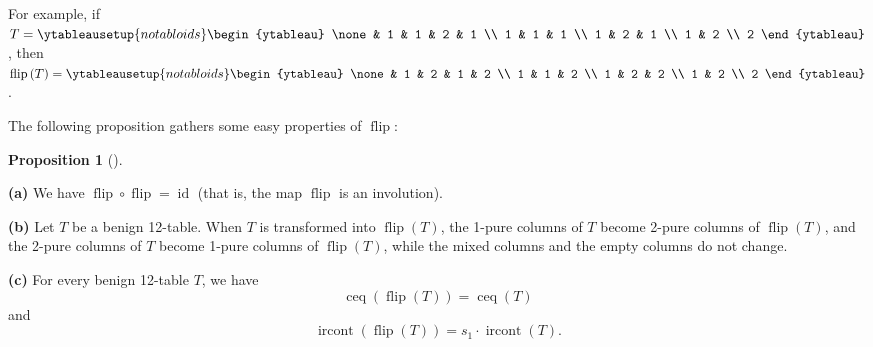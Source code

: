 \documentclass[numbers=enddot,12pt,final,onecolumn,notitlepage]{scrartcl}%
\theoremstyle{definition}
\newtheorem{prop}[theo]{Proposition}
\newenvironment{proposition}[1][]
{\begin{prop}[#1]\begin{leftbar}}
{\end{leftbar}\end{prop}}
\begin{document}
For example, if $T=%
\ytableausetup{notabloids}
\begin{ytableau}
\none& 1 & 1 & 2 & 1 \\
1 & 1 & 1 \\
1 & 2 & 1 \\
1 & 2 \\
2
\end{ytableau}%
$, then $\operatorname*{flip}\left(  T\right)  =%
\ytableausetup{notabloids}
\begin{ytableau}
\none& 1 & 2 & 1 & 2 \\
1 & 1 & 2 \\
1 & 2 & 2 \\
1 & 2 \\
2
\end{ytableau}%
$.

The following proposition gathers some easy properties of
$\operatorname*{flip}$:

\begin{proposition}
\label{prop.flip}\textbf{(a)} We have $\operatorname*{flip}\circ
\operatorname*{flip}=\operatorname*{id}$ (that is, the map
$\operatorname*{flip}$ is an involution).

\textbf{(b)} Let $T$ be a benign 12-table. When $T$ is transformed into
$\operatorname*{flip}\left(  T\right)  $, the 1-pure columns of $T$ become
2-pure columns of $\operatorname*{flip}\left(  T\right)  $, and the 2-pure
columns of $T$ become 1-pure columns of $\operatorname*{flip}\left(  T\right)
$, while the mixed columns and the empty columns do not change.

\textbf{(c)} For every benign 12-table $T$, we have%
\begin{equation}
\operatorname*{ceq}\left(  \operatorname*{flip}\left(  T\right)  \right)
=\operatorname*{ceq}\left(  T\right)  \label{pf.lem.BK.flip.ceq}%
\end{equation}
and%
\begin{equation}
\operatorname*{ircont}\left(  \operatorname*{flip}\left(  T\right)  \right)
=s_{1}\cdot\operatorname*{ircont}\left(  T\right)  .
\label{pf.lem.BK.flip.ircont}%
\end{equation}

\end{proposition}
\end{document}
